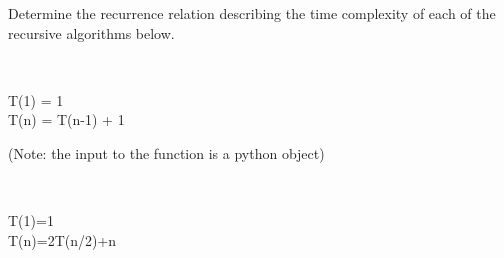 \begin{prob}

    Determine the recurrence relation describing the time complexity of each of the recursive algorithms below.
        \begin{subprobset}
            \begin{subprob}
                \inputminted{python}{\thisdir/include/part_a.py}
                \begin{soln}
                    \\
                    T(1) = 1
                    \\
                    T(n) = T(n-1) + 1
                \end{soln}  
            \end{subprob}
            \begin{subprob}
                (Note: the input  to the function is a python  object)
                \inputminted{python}{\thisdir/include/part_b.py}
                \begin{soln}
                    \\
                    T(1)=1
                    \\
                    T(n)=2T(n/2)+n
                \end{soln}  
            \end{subprob}
        \end{subprobset}

\end{prob}

